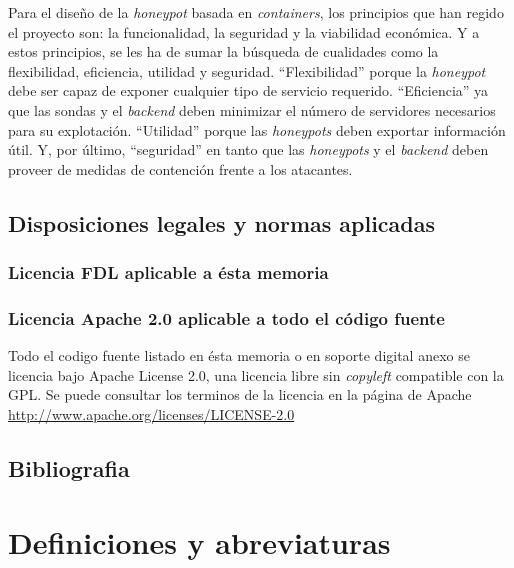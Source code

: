 Para el diseño de la \emph{honeypot} basada en \emph{containers}, los principios que han regido el proyecto son: la funcionalidad, la seguridad y la viabilidad económica. Y a estos principios, se les ha de sumar la búsqueda de cualidades como la flexibilidad, eficiencia, utilidad y seguridad. ``Flexibilidad'' porque la \emph{honeypot} debe ser capaz de exponer cualquier tipo de servicio requerido. ``Eficiencia'' ya que las sondas y el \emph{backend} deben minimizar el número de servidores necesarios para su explotación. ``Utilidad'' porque las \emph{honeypots} deben exportar información útil. Y, por último, ``seguridad''  en tanto que las \emph{honeypots} y el \emph{backend} deben proveer de medidas de contención frente a los atacantes.


\nocite{*}
\nopagebreak
\printbibheading[title={Normas y referencias},heading=subbibnumbered]
\subsection{Disposiciones legales y normas aplicadas}
\subsubsection{Licencia FDL aplicable a ésta memoria}

\subsubsection{Licencia Apache 2.0 aplicable a todo el código fuente}
Todo el codigo fuente listado en ésta memoria o en soporte digital anexo se licencia bajo Apache License 2.0, una licencia libre sin \emph{copyleft} compatible con la GPL.
Se puede consultar los terminos de la licencia en la página de Apache \url{http://www.apache.org/licenses/LICENSE-2.0}

\subsection{Bibliografia}
\printbibliography[title={Referencias},heading=none]
\nopagebreak
\section{Definiciones y abreviaturas}

